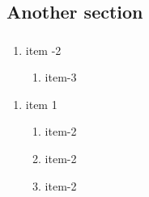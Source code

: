 \documentclass[aspectratio=169]{beamer}
\begin{document}
\subsection{Another section}
\begin{frame}[allowframebreaks]
    \frametitle{\secname \textrightarrow}

    \framebreak






    \begin{enumerate}
        \item item -2

              \vspace{1cm}

              \begin{enumerate}
                  \item item-3

                        \vspace{0.5cm}

              \end{enumerate}

    \end{enumerate}

    \framebreak




    \begin{enumerate}
        \item item 1

              \vspace{1cm}

              \begin{enumerate}
                  \item item-2

                        \vspace{0.5cm}
                  \item item-2

                        \vspace{0.5cm}
                  \item  item-2


              \end{enumerate}

    \end{enumerate}
\end{frame}
\end{document}

